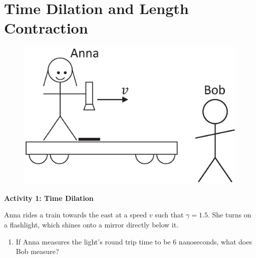 \section{Time Dilation and Length Contraction}

\makelabheader %

\bigskip

\begin{figure}
\begin{center}
\vspace{-0.3in}
\includegraphics[scale=0.4]{time_dilation_length_contraction/anna_and_bob.eps}
\end{center}
\end{figure}

\textbf{Activity 1: Time Dilation}

Anna rides a train towards the east at a speed $v$ such that $\gamma=1.5$.  She turns on a flashlight, which shines onto a mirror directly below it.

\begin{enumerate}
\item If Anna measures the light's round trip time to be 6 nanoseconds, what does Bob measure?
\answerspace{0.5in}
\end{enumerate}

